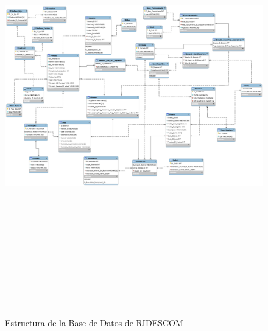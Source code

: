 		\label{BasedeDatos}
		\begin{figure}[hbt!]
			\centering
			\includegraphics[angle=90, width=14cm, height=19cm]{Imagenes/RIDESCOM.png}
			\caption{Estructura de la Base de Datos de RIDESCOM}
			\label{BaseDatos}
		\end{figure}
		
		
	
	\pagebreak
		
